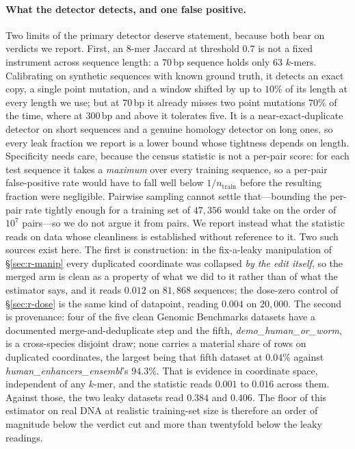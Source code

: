 \documentclass[webpdf,modern,large,namedate]{oup-authoring-template}%
\begin{document}
\paragraph{What the detector detects, and one false positive.}
Two limits of the primary detector deserve statement, because both bear on verdicts we report. First, an $8$-mer Jaccard at threshold $0.7$ is not a fixed instrument across sequence length: a $70$\,bp sequence holds only $63$ $k$-mers. Calibrating on synthetic sequences with known ground truth, it detects an exact copy, a single point mutation, and a window shifted by up to $10\%$ of its length at every length we use; but at $70$\,bp it already misses two point mutations $70\%$ of the time, where at $300$\,bp and above it tolerates five. It is a near-exact-duplicate detector on short sequences and a genuine homology detector on long ones, so every leak fraction we report is a lower bound whose tightness depends on length. Specificity needs care, because the census statistic is not a per-pair score: for each test sequence it takes a \emph{maximum} over every training sequence, so a per-pair false-positive rate would have to fall well below $1/n_{\text{train}}$ before the resulting fraction were negligible. Pairwise sampling cannot settle that---bounding the per-pair rate tightly enough for a training set of $47{,}356$ would take on the order of $10^{7}$ pairs---so we do not argue it from pairs. We report instead what the statistic reads on data whose cleanliness is established without reference to it. Two such sources exist here. The first is construction: in the fix-a-leaky manipulation of \S\ref{sec:r-manip} every duplicated coordinate was collapsed \emph{by the edit itself}, so the merged arm is clean as a property of what we did to it rather than of what the estimator says, and it reads $0.012$ on $81{,}868$ sequences; the dose-zero control of \S\ref{sec:r-dose} is the same kind of datapoint, reading $0.004$ on $20{,}000$. The second is provenance: four of the five clean Genomic Benchmarks datasets have a documented merge-and-deduplicate step and the fifth, \textit{demo\_human\_or\_worm}, is a cross-species disjoint draw; none carries a material share of rows on duplicated coordinates, the largest being that fifth dataset at $0.04\%$ against \textit{human\_enhancers\_ensembl}'s $94.3\%$. That is evidence in coordinate space, independent of any $k$-mer, and the statistic reads $0.001$ to $0.016$ across them. Against those, the two leaky datasets read $0.384$ and $0.406$. The floor of this estimator on real DNA at realistic training-set size is therefore an order of magnitude below the verdict cut and more than twentyfold below the leaky readings.
\end{document}
